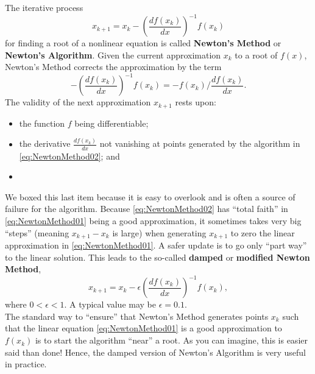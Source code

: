 \vspace*{0.5cm}
\begin{tcolorbox}[sharp corners, colback=green!30, colframe=green!80!blue,title=\textbf{Newton's Method}]

The iterative process
\begin{equation}
    \label{eq:NewtonMethod02}
x_{k+1}=x_{k} - \left(   \frac{df(x_k)}{dx}\right)^{-1} f(x_k)
\end{equation}
for finding a root of a nonlinear equation is called \textbf{Newton's Method} or \textbf{Newton's Algorithm}. Given the current approximation $x_k$ to a root of $f(x)$, Newton's Method corrects the approximation by the term  
$$-\left( \frac{df(x_k)}{dx}\right)^{-1} f(x_k) =  -{f(x_k)}\Big/{\frac{df(x_k)}{dx} }.$$  The validity of the next approximation $x_{k+1}$ rests upon: 
\begin{itemize}
    \item the function $f$ being differentiable;
    \item the derivative $\frac{df(x_k)}{dx}$ not vanishing at points generated by the algorithm in \eqref{eq:NewtonMethod02}; and
    \item {}
\end{itemize}
We boxed this last item because it is easy to overlook and is often a source of failure for the algorithm. Because \eqref{eq:NewtonMethod02} has ``total faith'' in \eqref{eq:NewtonMethod01} being a good approximation, it sometimes takes very big ``steps'' (meaning $x_{k+1}-x_k$ is large) when generating $x_{k+1}$ to zero the linear approximation in \eqref{eq:NewtonMethod01}. A safer update is to go only ``part way'' to the linear solution. This leads to the so-called \textbf{damped} or \textbf{modified Newton Method},
\begin{equation}
    \label{eq:NewtonMethodDamped}
\boxed{x_{k+1}=x_{k} - \epsilon \left(   \frac{df(x_k)}{dx}\right)^{-1} f(x_k)},
\end{equation}
where $0< \epsilon < 1$. A typical value may be $\epsilon=0.1$.\\

The standard way to ``ensure'' that Newton's Method generates points $x_k$ such that the linear equation \eqref{eq:NewtonMethod01} is a good approximation to $f(x_k)$ is to start the algorithm ``near'' a root. As you can imagine, this is easier said than done! Hence, the damped version of Newton's Algorithm is very useful in practice.

\end{tcolorbox}

